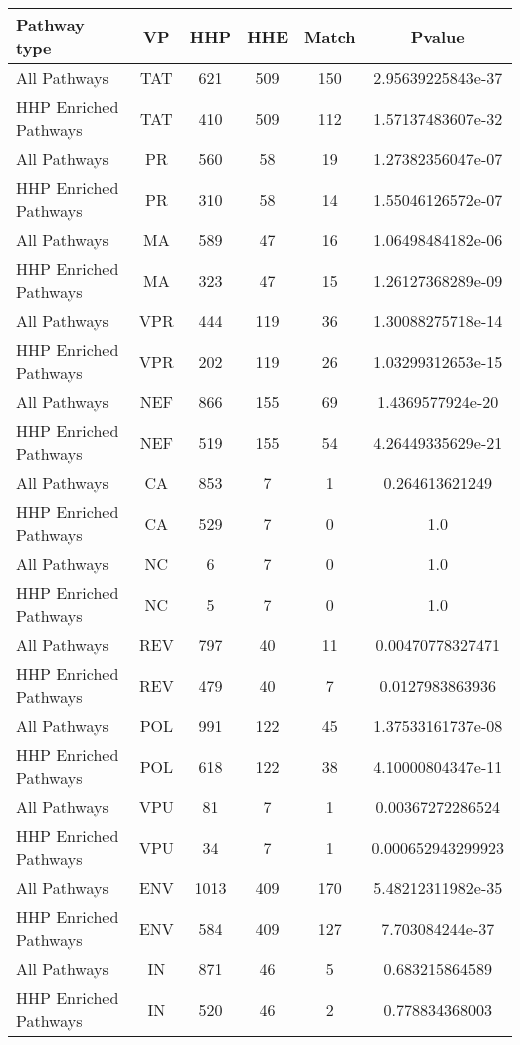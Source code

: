 \begin{table}\footnotesize
\begin{center}
  \begin{tabular}{|l|c|c|c|c|c|}
  \hline
   Pathway type & VP & HHP & HHE & Match & Pvalue \\
  \hline
All Pathways & TAT & 621 & 509 & 150 & 2.95639225843e-37 \\
HHP Enriched Pathways & TAT & 410 & 509 & 112 & 1.57137483607e-32 \\
All Pathways & PR & 560 & 58 & 19 & 1.27382356047e-07 \\
HHP Enriched Pathways & PR & 310 & 58 & 14 & 1.55046126572e-07 \\
All Pathways & MA & 589 & 47 & 16 & 1.06498484182e-06 \\
HHP Enriched Pathways & MA & 323 & 47 & 15 & 1.26127368289e-09 \\
All Pathways & VPR & 444 & 119 & 36 & 1.30088275718e-14 \\
HHP Enriched Pathways & VPR & 202 & 119 & 26 & 1.03299312653e-15 \\
All Pathways & NEF & 866 & 155 & 69 & 1.4369577924e-20 \\
HHP Enriched Pathways & NEF & 519 & 155 & 54 & 4.26449335629e-21 \\
All Pathways & CA & 853 & 7 & 1 & 0.264613621249 \\
HHP Enriched Pathways & CA & 529 & 7 & 0 & 1.0 \\
All Pathways & NC & 6 & 7 & 0 & 1.0 \\
HHP Enriched Pathways & NC & 5 & 7 & 0 & 1.0 \\
All Pathways & REV & 797 & 40 & 11 & 0.00470778327471 \\
HHP Enriched Pathways & REV & 479 & 40 & 7 & 0.0127983863936 \\
All Pathways & POL & 991 & 122 & 45 & 1.37533161737e-08 \\
HHP Enriched Pathways & POL & 618 & 122 & 38 & 4.10000804347e-11 \\
All Pathways & VPU & 81 & 7 & 1 & 0.00367272286524 \\
HHP Enriched Pathways & VPU & 34 & 7 & 1 & 0.000652943299923 \\
All Pathways & ENV & 1013 & 409 & 170 & 5.48212311982e-35 \\
HHP Enriched Pathways & ENV & 584 & 409 & 127 & 7.703084244e-37 \\
All Pathways & IN & 871 & 46 & 5 & 0.683215864589 \\
HHP Enriched Pathways & IN & 520 & 46 & 2 & 0.778834368003 \\

\end{tabular}
\end{center}
\end{table}
